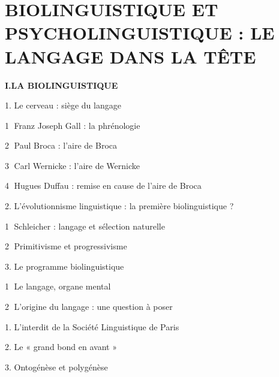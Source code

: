 \chapter{BIOLINGUISTIQUE ET PSYCHOLINGUISTIQUE : LE LANGAGE DANS LA TÊTE}
\label{chapter-15}
\begin{keybox}
\small{}
\textbf{I.\quad LA BIOLINGUISTIQUE}\par
\hspace*{1em}1. Le cerveau : siège du langage\par
\hspace*{2em}\textcircled{\scriptsize 1} Franz Joseph Gall : la phrénologie\par
\hspace*{2em}\textcircled{\scriptsize 2} Paul Broca : l’aire de Broca\par
\hspace*{2em}\textcircled{\scriptsize 3} Carl Wernicke : l’aire de Wernicke\par
\hspace*{2em}\textcircled{\scriptsize 4} Hugues Duffau : remise en cause de l’aire de Broca\par
\hspace*{1em}2. L’évolutionnisme linguistique : la première biolinguistique ?\par
\hspace*{2em}\textcircled{\scriptsize 1} Schleicher : langage et sélection naturelle\par
\hspace*{2em}\textcircled{\scriptsize 2} Primitivisme et progressivisme\par
\hspace*{1em}3. Le programme biolinguistique\par
\hspace*{2em}\textcircled{\scriptsize 1} Le langage, organe mental\par
\hspace*{2em}\textcircled{\scriptsize 2} L’origine du langage : une question à poser\par
\hspace*{3em}1. L’interdit de la Société Linguistique de Paris\par
\hspace*{3em}2. Le « grand bond en avant »\par
\hspace*{3em}3. Ontogénèse et polygénèse\par

\end{keybox}
